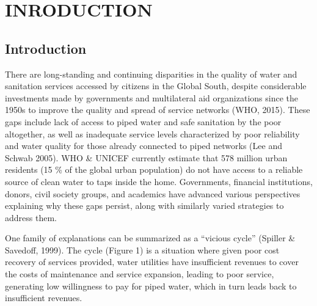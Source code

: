 \documentclass[12pt,report]{uncdissertation}
\begin{document}
\begin{singlespace}
\listoffigures
\end{singlespace}






\setlength{\baselineskip}{1.0\oldbaselineskip}
\setlength{\parskip}{1.0\oldparskip}


\renewcommand{\listabbreviationname}{LIST OF ABBREVIATIONS}
\newpage
{}
\addcontentsline{toc}{chapter}{\listabbreviationname  }
\listofabbreviations



\mainmatter

\chapter{\uppercase{Inroduction}}

\hypertarget{introduction}{%
\section{Introduction}\label{introduction}}

There are long-standing and continuing disparities in the quality of
water and sanitation services accessed by citizens in the Global South,
despite considerable investments made by governments and multilateral
aid organizations since the 1950s to improve the quality and spread of
service networks (WHO, 2015). These gaps include lack of access to piped
water and safe sanitation by the poor altogether, as well as inadequate
service levels characterized by poor reliability and water quality for
those already connected to piped networks (Lee and Schwab 2005). WHO \&
UNICEF currently estimate that 578 million urban residents (15 \% of the
global urban population) do not have access to a reliable source of
clean water to taps inside the home. Governments, financial
institutions, donors, civil society groups, and academics have advanced
various perspectives explaining why these gaps persist, along with
similarly varied strategies to address them.

One family of explanations can be summarized as a \enquote{vicious
cycle} (Spiller \& Savedoff, 1999). The cycle (Figure 1) is a situation
where given poor cost recovery of services provided, water utilities
have insufficient revenues to cover the costs of maintenance and service
expansion, leading to poor service, generating low willingness to pay
for piped water, which in turn leads back to insufficient revenues.
\end{document}
